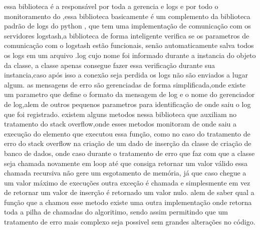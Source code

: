 \documentclass[
	12pt,				%
	openright,			%
	oneside,			%
	a4paper,			%
	english,			%
	french,				%
	spanish,			%
	brazil,				%
	]{abntex2}
\begin{document}
essa biblioteca é a responsável por toda a gerencia e logs e por todo o monitoramento do ,essa biblioteca basicamente é um complemento da biblioteca padrão de logs do python \cite{logging},
que tem uma implementação de comunicação com os servidores logstash,a biblioteca de forma inteligente verifica se os parametros de comunicação com o logstash estão funcionais,
senão automaticamente salva todos os logs em um arquivo .log cujo nome foi informado durante a instancia do objeto da classe,
a classe apenas consegue fazer essa verificação durante sua instancia,caso após isso a conexão seja perdida os logs não são enviados a lugar algum.
as mensagens de erro são gerenciadas de forma simplificada,onde existe um parametro que define o formato da mensagem de log e o nome do gerenciador de log,alem de outros pequenos parametros para identificação de onde saiu o log que foi registrado.
existem alguns metodos nessa biblioteca que auxiliam no tratamento do stack overflow,onde esses metodos monitoram de onde saiu a execução do elemento que executou essa função,
como no caso do tratamento de erro do stack overflow na criação de um dado de inserção da classe de criação de banco de dados,
onde caso durante o tratamento de erro que faz com que a classe seja chamada novamente em loop até que consiga retornar um valor válido essa chamada recursiva não gere um esgotamento de memória,
já que caso chegue a um valor máximo de execuções outra exceção é chamada e simplesmente em vez de retornar um valor de inserção é retornado um valor nulo.
alem de saber qual a função que a chamou esse metodo existe uma outra implementação onde retorna toda a pilha de chamadas do algoritimo,
sendo assim permitindo que um tratamento de erro mais complexo seja possivel sem grandes alterações no código.
\end{document}
